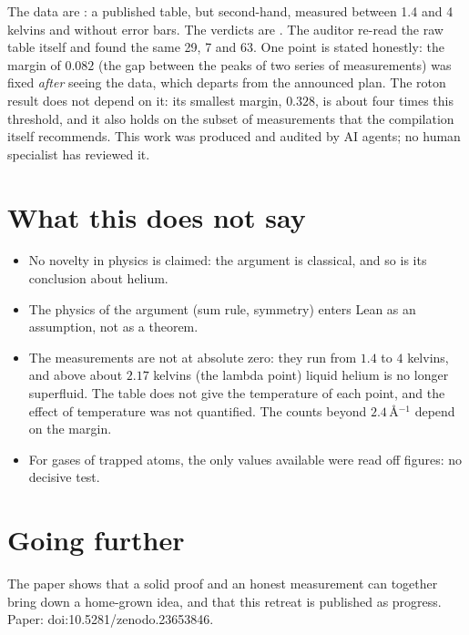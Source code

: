 The data are : a published table, but second-hand, measured between 1.4 and 4 kelvins and without error
bars. The verdicts are . The auditor re-read the raw table itself and found the same 29, 7 and 63. One
point is stated honestly: the margin of $0.082$ (the gap between the peaks of two series of measurements) was fixed
\emph{after} seeing the data, which departs from the announced plan. The roton result does not depend on it: its
smallest margin, $0.328$, is about four times this threshold, and it also holds on the subset of measurements that the
compilation itself recommends. This work was produced and audited by AI agents; no human specialist has reviewed it.

\section*{What this does not say}

\begin{limite}
\begin{itemize}
\item No novelty in physics is claimed: the argument is classical, and so is its conclusion about helium.
\item The physics of the argument (sum rule, symmetry) enters Lean as an assumption, not as a theorem.
\item The measurements are not at absolute zero: they run from $1.4$ to $4$ kelvins, and above about $2.17$
  kelvins (the lambda point) liquid helium is no longer superfluid. The table does not give the temperature of each
  point, and the effect of temperature was not quantified. The counts beyond $2.4$\,Å$^{-1}$ depend on the
  margin.
\item For gases of trapped atoms, the only values available were read off figures: no decisive test.
\end{itemize}
\end{limite}

\section*{Going further}

The paper shows that a solid proof and an honest measurement can together bring down a home-grown idea, and that this
retreat is published as progress. Paper: doi:10.5281/zenodo.23653846.
